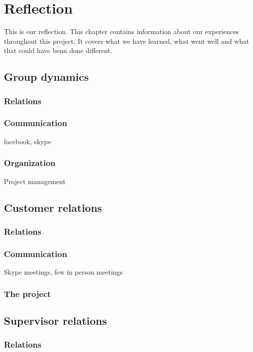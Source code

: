 \chapter{Reflection} 
\label{ch:reflection}


This is our reflection. This chapter contains information about our experiences throughout this project. It covers what we have learned, what went well and what that could have benn done different. 


\section{Group dynamics}
\subsection{Relations}
\subsection{Communication}
facebook, skype
\subsection{Organization}
Project management



\section{Customer relations}
\subsection{Relations}

\subsection{Communication}
Skype meetings, few in person meetings
\subsection{The project}



\section{Supervisor relations}
\subsection{Relations}
